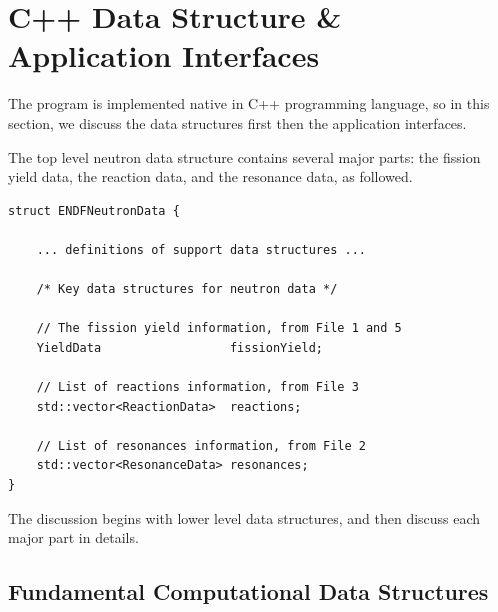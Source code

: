 \clearpage
\section{C++ Data Structure \& Application Interfaces}
The program is implemented native in C++ programming language, so in this section, we discuss the data structures first then the application interfaces.

The top level neutron data structure contains several major parts: the fission yield data, the reaction data, and the resonance data, as followed. 
\begin{verbatim} 
struct ENDFNeutronData {

    ... definitions of support data structures ...

    /* Key data structures for neutron data */
    
    // The fission yield information, from File 1 and 5
    YieldData                  fissionYield;
    
    // List of reactions information, from File 3
    std::vector<ReactionData>  reactions;
    
    // List of resonances information, from File 2
    std::vector<ResonanceData> resonances;
}
\end{verbatim}
The discussion begins with lower level data structures, and then discuss each major part in details.

\subsection{Fundamental Computational Data Structures}

